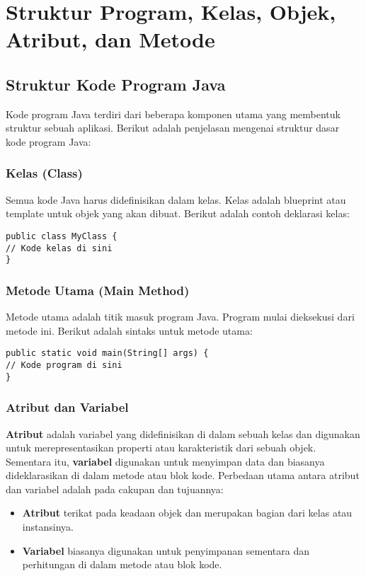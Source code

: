 
\chapter{Struktur Program, Kelas, Objek, Atribut, dan Metode}

\section{Struktur Kode Program Java}

Kode program Java terdiri dari beberapa komponen utama yang membentuk struktur sebuah aplikasi. Berikut adalah penjelasan mengenai struktur dasar kode program Java:

\subsection{Kelas (Class)}

Semua kode Java harus didefinisikan dalam kelas. Kelas adalah blueprint atau template untuk objek yang akan dibuat. Berikut adalah contoh deklarasi kelas:

\begin{lstlisting}[style=JavaStyle]
public class MyClass {
// Kode kelas di sini
}
\end{lstlisting}

\subsection{Metode Utama (Main Method)}

Metode utama adalah titik masuk program Java. Program mulai dieksekusi dari metode ini. Berikut adalah sintaks untuk metode utama:

\begin{lstlisting}[style=JavaStyle]
public static void main(String[] args) {
// Kode program di sini
}
\end{lstlisting}

\subsection{Atribut dan Variabel}
\textbf{Atribut} adalah variabel yang didefinisikan di dalam sebuah kelas dan digunakan untuk merepresentasikan properti atau karakteristik dari sebuah objek. Sementara itu, \textbf{variabel} digunakan untuk menyimpan data dan biasanya dideklarasikan di dalam metode atau blok kode. Perbedaan utama antara atribut dan variabel adalah pada cakupan dan tujuannya:
\begin{itemize}
	\item \textbf{Atribut} terikat pada keadaan objek dan merupakan bagian dari kelas atau instansinya.
	\item \textbf{Variabel} biasanya digunakan untuk penyimpanan sementara dan perhitungan di dalam metode atau blok kode.
\end{itemize}


